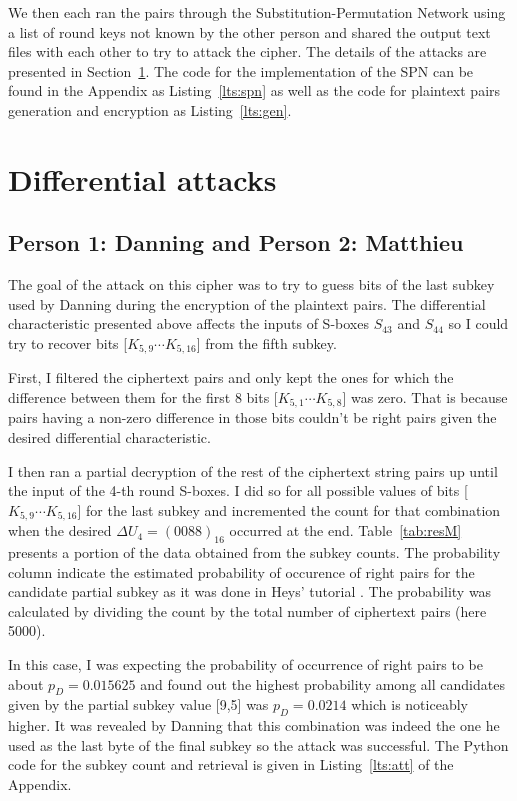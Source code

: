 \documentclass[letterpaper,12pt]{article}
\begin{document}
We then each ran the pairs through the Substitution-Permutation Network using a list of round keys not known by the other person and shared the output text files with each other to try to attack the cipher.
The details of the attacks are presented in Section~\ref{sec:attacks}.
The code for the implementation of the SPN can be found in the Appendix as Listing~\ref{lts:spn} as well as the code for plaintext pairs generation and encryption as Listing~\ref{lts:gen}.

\section{Differential attacks}
\label{sec:attacks}
\subsection{Person 1: Danning and Person 2: Matthieu}
The goal of the attack on this cipher was to try to guess bits of the last subkey used by Danning during the encryption of the plaintext pairs.
The differential characteristic presented above affects the inputs of S-boxes $S_{43}$ and $S_{44}$ so I could try to recover bits [$K_{5,9} \cdots K_{5,16}$]
from the fifth subkey.

First, I filtered the ciphertext pairs and only kept the ones for which the difference between them for the first 8 bits [$K_{5,1} \cdots K_{5,8}$] was zero.
That is because pairs having a non-zero difference in those bits couldn't be right pairs given the desired differential characteristic.

I then ran a partial decryption of the rest of the ciphertext string pairs up until the input of the 4-th round S-boxes.
I did so for all possible values of bits [$K_{5,9} \cdots K_{5,16}$] for the last subkey and incremented the count for that combination when the desired $\Delta U_{4} = (0088)_{16}$ occurred at the end.
Table~\ref{tab:resM} presents a portion of the data obtained from the subkey counts. The probability column indicate the estimated probability of occurence of right pairs for the candidate partial subkey as it was done in Heys' tutorial \cite{heys}.
The probability was calculated by dividing the count by the total number of ciphertext pairs (here 5000).

In this case, I was expecting the probability of occurrence of right pairs to be about $ p_{D} = 0.015625 $ and found out the highest probability among all candidates given by the partial subkey value [9,5] was $p_{D} = 0.0214$ which is noticeably higher.
It was revealed by Danning that this combination was indeed the one he used as the last byte of the final subkey so the attack was successful. The Python code for the subkey count and retrieval is given in Listing~\ref{lts:att} of the Appendix.
\end{document}
